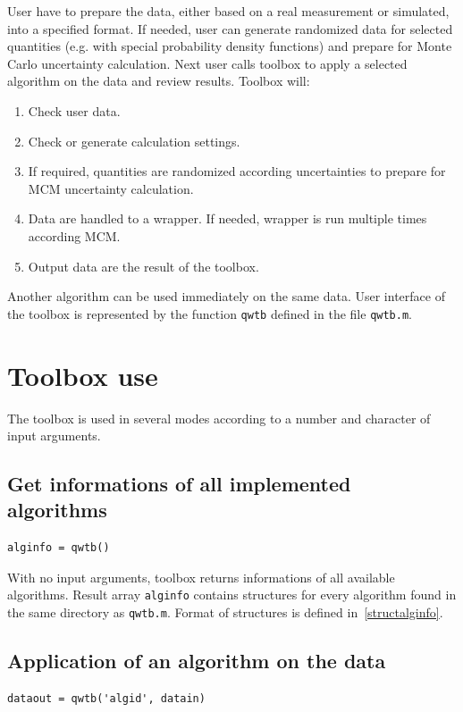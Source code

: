 \documentclass[12pt,a4paper,oneside]{report} %
\begin{document}
User have to prepare the data, either based on a real measurement or simulated, into a specified
format. If needed, user can generate randomized data for selected quantities (e.g. with special
probability density functions) and prepare for Monte Carlo uncertainty calculation. Next user calls
toolbox to apply a selected algorithm on the data and review results. Toolbox will:
\begin{enumerate}
        \item Check user data.
        \item Check or generate calculation settings.
        \item If required, quantities are randomized according uncertainties to prepare for MCM uncertainty calculation.
        \item Data are handled to a wrapper. If needed, wrapper is run multiple times according MCM.
        \item Output data are the result of the toolbox.
\end{enumerate}

Another algorithm can be used immediately on the same data. User interface of the toolbox is represented
by the function \lstinline{qwtb} defined in the file {\tt qwtb.m}.

\section{Toolbox use} %
The toolbox is used in several modes according to a number and character of input arguments.

\subsection{Get informations of all implemented algorithms} %
\begin{lstlisting}
alginfo = qwtb()
\end{lstlisting}

With no input arguments, toolbox returns informations of all available algorithms. Result array
\lstinline{alginfo} contains structures for every algorithm found in the same directory as
\texttt{qwtb.m}. Format of structures is defined in~\ref{structalginfo}.

\subsection{Application of an algorithm on the data} %
\begin{lstlisting}
dataout = qwtb('algid', datain)
\end{lstlisting}
\end{document}
